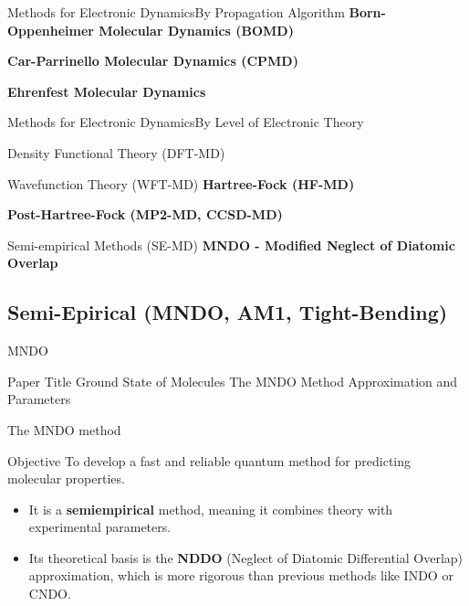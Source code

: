 \begin{frame}{Methods for Electronic Dynamics}{By Propagation Algorithm}
    \textbf{Born-Oppenheimer Molecular Dynamics (BOMD)}
    \vspace{1em}
    
    \textbf{Car-Parrinello Molecular Dynamics (CPMD)}
    \vspace{1em}
    
    \textbf{Ehrenfest Molecular Dynamics}
\end{frame}

\begin{frame}{Methods for Electronic Dynamics}{By Level of Electronic Theory}
    \begin{block}{Density Functional Theory (DFT-MD)}
    \end{block}
    
    \begin{block}{Wavefunction Theory (WFT-MD)}
        \textbf{Hartree-Fock (HF-MD)}
        \vspace{0.5em}
        
        \textbf{Post-Hartree-Fock (MP2-MD, CCSD-MD)}
    \end{block}
    
    \begin{block}{Semi-empirical Methods (SE-MD)}
    	\textbf{MNDO - Modified Neglect of Diatomic Overlap}
    \end{block}
\end{frame}

\subsection{Semi-Epirical (MNDO, AM1, Tight-Bending)}


\begin{frame}{MNDO}
	\begin{block}{Paper Title}
	Ground State of Molecules The MNDO Method Approximation and Parameters
	\end{block}
\end{frame}

\begin{frame}{The MNDO method}
    \begin{block}{Objective}
        To develop a fast and reliable quantum method for predicting molecular properties.
    \end{block}
    \pause
    
    \begin{itemize}
        \item It is a \textbf{semiempirical} method, meaning it combines theory with experimental parameters.
        \pause
        \bigskip
        \item Its theoretical basis is the \textbf{NDDO} (Neglect of Diatomic Differential Overlap) approximation, which is more rigorous than previous methods like INDO or CNDO.
    \end{itemize}
\end{frame}

